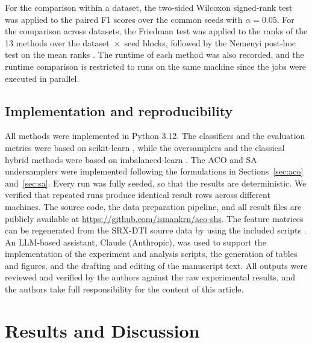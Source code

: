 \documentclass[pdflatex,sn-basic]{sn-jnl}
\begin{document}
For the comparison within a dataset, the two-sided Wilcoxon signed-rank
test was applied to the paired F1 scores over the common seeds with
$\alpha = 0.05$. For the comparison across datasets, the Friedman test
was applied to the ranks of the 13 methods over the
dataset~$\times$~seed blocks, followed by the Nemenyi post-hoc test on
the mean ranks \citep{demsar2006statistical}. The runtime of each
method was also recorded, and the runtime comparison is restricted to
runs on the same machine since the jobs were executed in parallel.

\subsection{Implementation and reproducibility}
All methods were implemented in Python 3.12. The classifiers and the
evaluation metrics were based on scikit-learn
\citep{pedregosa2011scikit}, while the oversamplers and the classical
hybrid methods were based on imbalanced-learn
\citep{lemaitre2017imbalanced}. The ACO and SA undersamplers were
implemented following the formulations in Sections~\ref{sec:aco} and~\ref{sec:sa}. Every
run was fully seeded, so that the results are deterministic. We
verified that repeated runs produce identical result rows across
different machines. The source code, the data preparation pipeline, and all result
files are publicly available at
\url{https://github.com/ismankrn/aco-shs}. The feature matrices can be
regenerated from the SRX-DTI source data by using the included scripts
\citep{khojasteh2023improving}. An LLM-based assistant, Claude (Anthropic), was used to
support the implementation of the experiment and analysis scripts,
the generation of tables and figures, and the drafting and editing of
the manuscript text. All outputs were reviewed and verified by the
authors against the raw experimental results, and the authors take
full responsibility for the content of this article.

\section{Results and Discussion}
\end{document}
